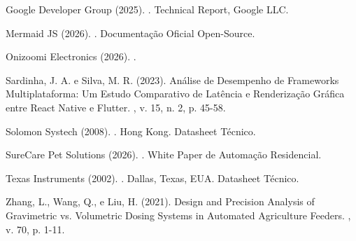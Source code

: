 \documentclass[12pt]{article}\usepackage{sbc-template}\usepackage{graphicx,url}\usepackage[utf8]{inputenc}
\begin{document}
\begin{thebibliography}{}
Google Developer Group (2025).
.
\newblock Technical Report, Google LLC.

Mermaid JS (2026).
.
\newblock Documentação Oficial Open-Source.

Onizoomi Electronics (2026).
.

Sardinha, J. A. e Silva, M. R. (2023).
\newblock Análise de Desempenho de Frameworks Multiplataforma: Um Estudo Comparativo de Latência e Renderização Gráfica entre React Native e Flutter.
, v. 15, n. 2, p. 45-58.

Solomon Systech (2008).
.
\newblock Hong Kong. Datasheet Técnico.

SureCare Pet Solutions (2026).
.
\newblock White Paper de Automação Residencial.

Texas Instruments (2002).
.
\newblock Dallas, Texas, EUA. Datasheet Técnico.

Zhang, L., Wang, Q., e Liu, H. (2021).
\newblock Design and Precision Analysis of Gravimetric vs. Volumetric Dosing Systems in Automated Agriculture Feeders.
, v. 70, p. 1-11.

\end{thebibliography}
\end{document}
